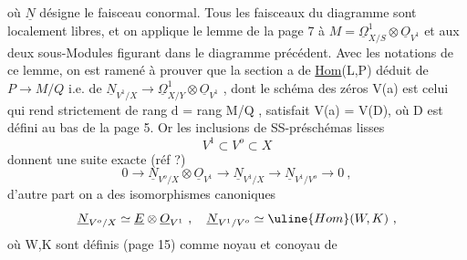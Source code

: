 où $\underline{N}$ désigne le faisceau conormal. Tous les faisceaux du diagramme sont
localement libres, et on applique le lemme de la page 7 à $M=\underline{\Omega}^1_{X/S}\otimes\underline{O}_{V^1}$
et aux deux sous-Modules figurant dans le diagramme précédent. Avec
les notations de ce lemme, on est ramené à prouver que la section a
 de \uline{Hom}(L,P) déduit de  $P\rightarrow M/Q$ i.e. de  $\underline{N}_{V^1/X}\longrightarrow\underline{\Omega}^1_{X/Y}\otimes\underline{O}_{V^1}$ ,
dont le schéma des zéros V(a) est celui qui rend \hand{$\mu$} strictement de rang
\hand{$<$} d = rang M/Q , satisfait V(a) = V(D), où D est défini au bas de la
page 5. Or les inclusions de SS-préschémas lisses
\[ V^1 \subset V^o \subset X \]
donnent une suite exacte (réf ?)
\[ 0 \rightarrow \underline{N}_{V^o/X}\otimes\underline{O}_{V^1} \rightarrow \underline{N}_{V^1/X} \longrightarrow \underline{N}_{V^1/V^o} \rightarrow 0 \ , \]
d'autre part on a des isomorphismes canoniques
\[ \underline{N}_{V^o/X} \simeq \underline{E}\otimes\underline{O}_{V^1} \ , \quad \underline{N}_{V^1/V^o} \simeq \uline{Hom}(W,K) \ , \]
où W,K sont définis (page 15) comme noyau et conoyau de

